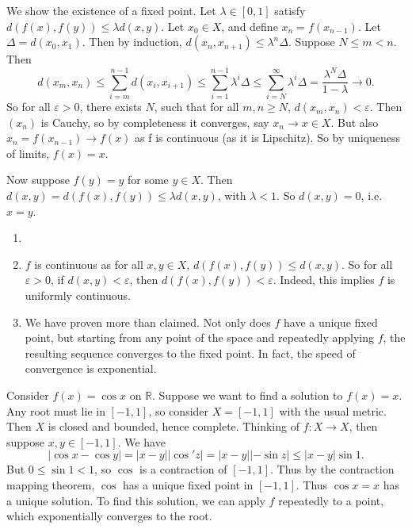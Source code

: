 \documentclass[12pt]{article}
\begin{document}
\begin{proofbox} We show the existence of a fixed point. Let $\lambda \in [0, 1]$ satisfy $d(f(x), f(y)) \leq \lambda d(x, y)$. Let $x_0 \in X$, and define $x_n = f(x_{n-1})$. Let $\Delta = d(x_0, x_1)$. Then by induction, $d(x_n, x_{n+1}) \leq \lambda^{n} \Delta$. Suppose $N \leq m < n$. Then
	\[
		d(x_m, x_n) \leq \sum_{i = m}^{n-1}d(x_i, x_{i+1}) \leq \sum_{i = 1}^{n-1} \lambda^{i} \Delta \leq \sum_{i = N}^{\infty} \lambda^{i} \Delta = \frac{\lambda^{N}\Delta}{1 - \lambda} \to 0
	.\]
	So for all $\varepsilon > 0$, there exists $N$, such that for all $m, n \geq N$, $d(x_m, x_n) < \varepsilon$. Then $(x_n)$ is Cauchy, so by completeness it converges, say $x_n \to x \in X$. But also $x_n = f(x_{n-1}) \to f(x)$ as f is continuous (as it is Lipschitz). So by uniqueness of limits, $f(x) = x$.

	Now suppose $f(y) = y$ for some $y \in X$. Then $d(x, y) = d(f(x), f(y)) \leq \lambda d(x, y)$, with $\lambda < 1$. So $d(x, y) = 0$, i.e. $x = y$.
\end{proofbox}

\begin{remark}
	\begin{enumerate}[1.]
		\item[]
		\item $f$ is continuous as for all $x, y \in X$, $d(f(x), f(y)) \leq d(x, y)$. So for all $\varepsilon > 0$, if $d(x, y) < \varepsilon$, then $d(f(x), f(y)) < \varepsilon$. Indeed, this implies $f$ is uniformly continuous.
		\item We have proven more than claimed. Not only does $f$ have a unique fixed point, but starting from any point of the space and repeatedly applying $f$, the resulting sequence converges to the fixed point. In fact, the speed of convergence is exponential.
	\end{enumerate}
\end{remark}

\begin{exbox}
	Consider $f(x) = \cos x$ on $\mathbb{R}$. Suppose we want to find a solution to $f(x) = x$. Any root must lie in $[-1, 1]$, so consider $X = [-1, 1]$ with the usual metric. Then $X$ is closed and bounded, hence complete. Thinking of $f : X \to X$, then suppose $x, y \in [-1, 1]$. We have
	\[
	|\cos x - \cos y| = |x - y||\cos' z| = |x - y||- \sin z| \leq |x - y| \sin 1
	.\]
	But $0 \leq \sin 1 < 1$, so $\cos$ is a contraction of $[-1, 1]$. Thus by the contraction mapping theorem, $\cos$ has a unique fixed point in $[-1, 1]$. Thus $\cos x = x$ has a unique solution. To find this solution, we can apply $f$ repeatedly to a point, which exponentially converges to the root.
\end{exbox}
\end{document}
